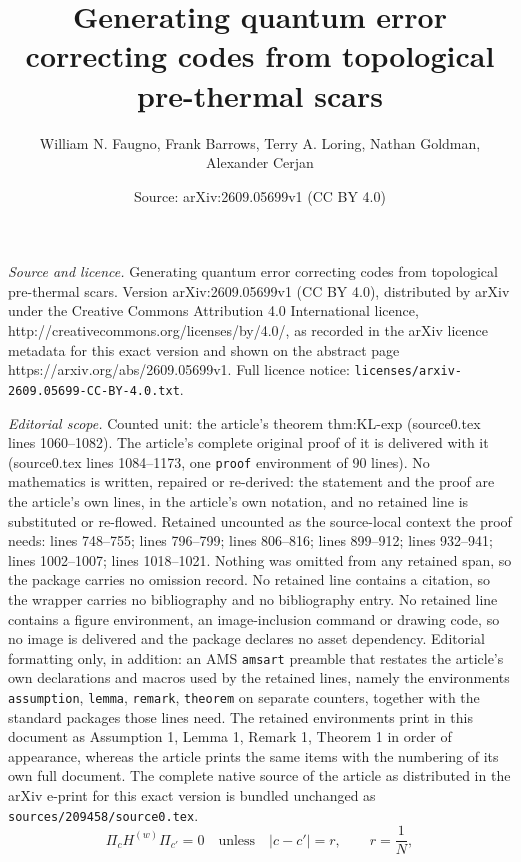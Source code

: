\documentclass[10pt,a4paper]{amsart}
\title{Generating quantum error correcting codes from topological pre-thermal scars}
\author{William N. Faugno, Frank Barrows, Terry A. Loring, Nathan Goldman, Alexander Cerjan}
\date{Source: arXiv:2609.05699v1 (CC BY 4.0)}
\newcommand{\abs}[1]{\lvert #1\rvert}
\begin{document}
\maketitle

\noindent\emph{Source and licence.} Generating quantum error correcting codes from topological pre-thermal scars. Version arXiv:2609.05699v1 (CC BY 4.0), distributed by arXiv under the Creative Commons Attribution 4.0 International licence, http://creativecommons.org/licenses/by/4.0/, as recorded in the arXiv licence metadata for this exact version and shown on the abstract page https://arxiv.org/abs/2609.05699v1. Full licence notice: \texttt{licenses/arxiv-2609.05699-CC-BY-4.0.txt}.\par\smallskip

\noindent\textit{Editorial scope.} Counted unit: the article's theorem thm:KL-exp (source0.tex lines 1060--1082). The article's complete original proof of it is delivered with it (source0.tex lines 1084--1173, one \texttt{proof} environment of 90 lines). No mathematics is written, repaired or re-derived: the statement and the proof are the article's own lines, in the article's own notation, and no retained line is substituted or re-flowed.  Retained uncounted as the source-local context the proof needs: lines 748--755; lines 796--799; lines 806--816; lines 899--912; lines 932--941; lines 1002--1007; lines 1018--1021.  Nothing was omitted from any retained span, so the package carries no omission record.  No retained line contains a citation, so the wrapper carries no bibliography and no bibliography entry.  No retained line contains a figure environment, an image-inclusion command or drawing code, so no image is delivered and the package declares no asset dependency.  Editorial formatting only, in addition: an AMS \texttt{amsart} preamble that restates the article's own declarations and macros used by the retained lines, namely the environments \texttt{assumption}, \texttt{lemma}, \texttt{remark}, \texttt{theorem} on separate counters, together with the standard packages those lines need.  The retained environments print in this document as Assumption 1, Lemma 1, Remark 1, Theorem 1 in order of appearance, whereas the article prints the same items with the numbering of its own full document.  The complete native source of the article as distributed in the arXiv e-print for this exact version is bundled unchanged as \texttt{sources/209458/source0.tex}.
\begin{equation}
\Pi_cH^{(w)}\Pi_{c'}=0
\quad\text{unless}\quad
\abs{c-c'}=r,
\qquad
r=\frac1N,
\label{eq:range}
\end{equation}
\end{document}
